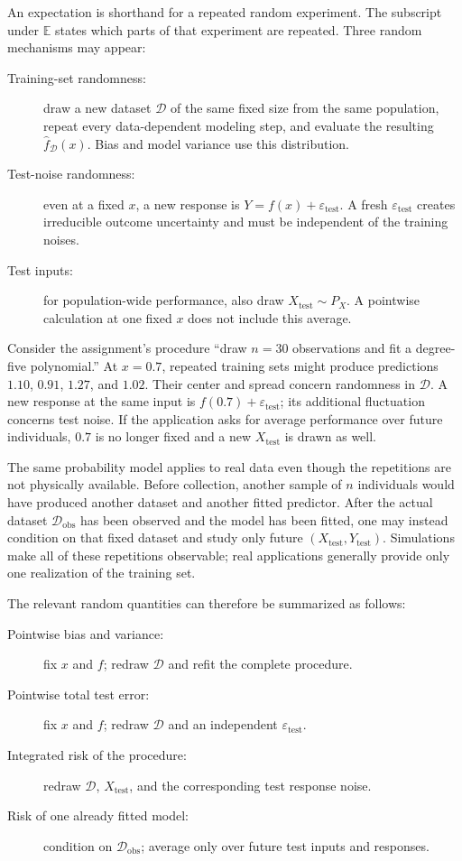 \documentclass[11pt,a4paper]{article}
\begin{document}
An expectation is shorthand for a repeated random experiment. The subscript under $\mathbb E$ states which parts of that experiment are repeated. Three random mechanisms may appear:
\begin{description}
  \item[Training-set randomness:] draw a new dataset $\mathcal D$ of the same fixed size from the same population, repeat every data-dependent modeling step, and evaluate the resulting $\widehat f_{\mathcal D}(x)$. Bias and model variance use this distribution.
  \item[Test-noise randomness:] even at a fixed $x$, a new response is $Y=f(x)+\varepsilon_{\mathrm{test}}$. A fresh $\varepsilon_{\mathrm{test}}$ creates irreducible outcome uncertainty and must be independent of the training noises.
  \item[Test inputs:] for population-wide performance, also draw $X_{\mathrm{test}}\sim P_X$. A pointwise calculation at one fixed $x$ does not include this average.
\end{description}

Consider the assignment's procedure ``draw $n=30$ observations and fit a degree-five polynomial.'' At $x=0.7$, repeated training sets might produce predictions $1.10$, $0.91$, $1.27$, and $1.02$. Their center and spread concern randomness in $\mathcal D$. A new response at the same input is $f(0.7)+\varepsilon_{\mathrm{test}}$; its additional fluctuation concerns test noise. If the application asks for average performance over future individuals, $0.7$ is no longer fixed and a new $X_{\mathrm{test}}$ is drawn as well.

The same probability model applies to real data even though the repetitions are not physically available. Before collection, another sample of $n$ individuals would have produced another dataset and another fitted predictor. After the actual dataset $\mathcal D_{\mathrm{obs}}$ has been observed and the model has been fitted, one may instead condition on that fixed dataset and study only future $(X_{\mathrm{test}},Y_{\mathrm{test}})$. Simulations make all of these repetitions observable; real applications generally provide only one realization of the training set.

The relevant random quantities can therefore be summarized as follows:
\begin{description}
  \item[Pointwise bias and variance:] fix $x$ and $f$; redraw $\mathcal D$ and refit the complete procedure.
  \item[Pointwise total test error:] fix $x$ and $f$; redraw $\mathcal D$ and an independent $\varepsilon_{\mathrm{test}}$.
  \item[Integrated risk of the procedure:] redraw $\mathcal D$, $X_{\mathrm{test}}$, and the corresponding test response noise.
  \item[Risk of one already fitted model:] condition on $\mathcal D_{\mathrm{obs}}$; average only over future test inputs and responses.
\end{description}
\end{document}
